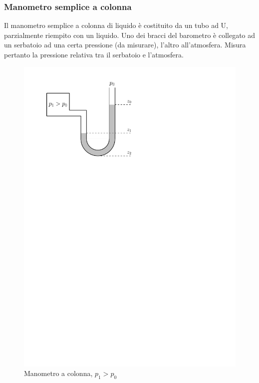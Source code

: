 \subsubsection{Manometro semplice a colonna}
Il manometro semplice a colonna di liquido è costituito da un tubo ad U, parzialmente riempito con un liquido.
Uno dei bracci del barometro è collegato ad un serbatoio ad una certa pressione (da misurare), l'altro all'atmosfera.
Misura pertanto la pressione relativa tra il serbatoio e l'atmosfera.
	\begin{figure}[ht]
		\includegraphics[scale=0.80]{./2.3 Manometri/2.3-1}
		\centering
		\caption{Manometro a colonna, $p_1 > p_0$}
	\end{figure}

